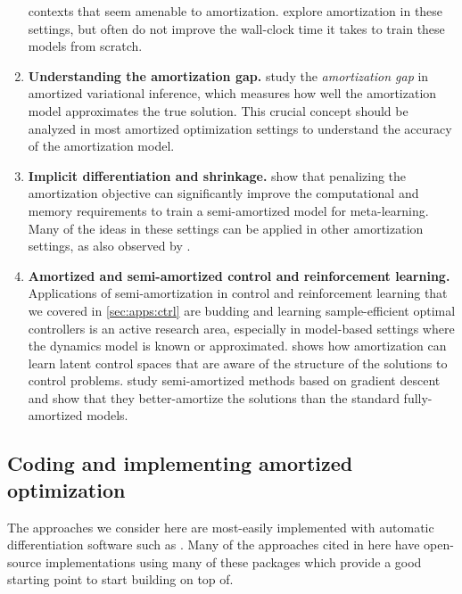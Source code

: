 \documentclass[twoside,11pt]{article}
\begin{document}
\begin{enumerate}
  contexts that seem amenable to amortization.
  \citet{venkataraman2021neural,bai2022neural}
  explore amortization in these settings, but often do not
  improve the wall-clock time it takes to train these models
  from scratch.
\item \textbf{Understanding the amortization gap.}
  \citet{cremer2018inference} study the \emph{amortization gap}
  in amortized variational inference, which measures how well the
  amortization model approximates the true solution.
  This crucial concept should be analyzed in most amortized
  optimization settings to understand the accuracy of
  the amortization model.
\item \textbf{Implicit differentiation and shrinkage.}
  \citet{chen2019modular,rajeswaran2019meta} show that penalizing
  the amortization objective can significantly improve the
  computational and memory requirements to train a semi-amortized
  model for meta-learning. Many of the ideas in these settings
  can be applied in other amortization settings,
  as also observed by \citet{huszar2019imaml}.
\item \textbf{Amortized and semi-amortized control and reinforcement learning.}
  Applications of semi-amortization in control and reinforcement learning
  that we covered in \cref{sec:apps:ctrl} are budding and
  learning sample-efficient optimal controllers is
  an active research area, especially in model-based settings
  where the dynamics model is known or approximated.
  \citet{amos2019dcem} shows how amortization can learn latent
  control spaces that are aware of the structure of the
  solutions to control problems.
  \citet{marino2020iterative} study semi-amortized methods
  based on gradient descent and show that they better-amortize
  the solutions than the standard fully-amortized models.
\end{enumerate}

\subsection{Coding and implementing amortized optimization}
The approaches we consider here are most-easily implemented
with automatic differentiation software such as
\citet{maclaurin2015autograd,al2016theano,abadi2016tensorflow,bezanson2017julia,agrawal2019tensorflow,paszke2019pytorch,bradbury2020jax}.
Many of the approaches cited in here have open-source implementations
using many of these packages which provide a good starting point
to start building on top of.
\end{document}
